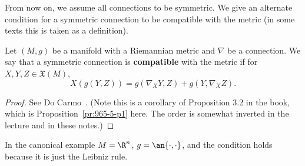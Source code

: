 From now on, we assume all connections to be symmetric. We give an alternate condition for a symmetric connection to be compatible with the metric (in some texts this is taken as a definition).
\begin{pr}
Let $(M,g)$ be a manifold with a Riemannian metric and $\nabla$ be a connection. We say that a symmetric connection is \textbf{compatible} with the metric if for $X,Y,Z\in \mathfrak X(M)$,
\[
X(g(Y,Z))=g(\nabla_XY,Z)+g(Y,\nabla_XZ).
\]
\end{pr}
\begin{proof}
See Do Carmo~\cite[p. 52, Corollary 3.3]{dC}. (Note this is a corollary of Proposition 3.2 in the book, which is Proposition~\ref{pr:965-5-p1} here. The order is somewhat inverted in the lecture and in these notes.)
\end{proof}
\begin{ex}
In the canonical example $M=\R^n$, $g=\an{\cdot,\cdot}$, and the condition holds because it is just the Leibniz rule.
\end{ex}

